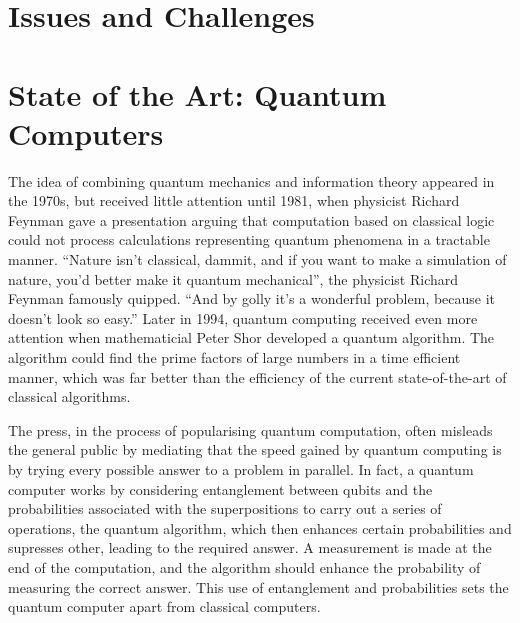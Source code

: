 \documentclass{article}
\begin{document}
\pagebreak
\section{Issues and Challenges}
\vspace{5mm}

\pagebreak
\section{State of the Art: Quantum Computers}
\vspace{5mm}

\noindent
The idea of combining quantum mechanics and information theory appeared in the 1970s, but received little attention until 1981, when physicist Richard Feynman gave a presentation arguing that computation based on classical logic could not process calculations representing quantum phenomena in a tractable manner. %
“Nature isn’t classical, dammit, and if you want to make a simulation of nature, you’d better make it
quantum mechanical”, the physicist Richard Feynman famously quipped. “And by golly it’s a
wonderful problem, because it doesn’t look so easy.” %
Later in 1994, quantum computing received even more attention when mathematicial Peter Shor developed a quantum algorithm. The algorithm could find the prime factors of large numbers in a time efficient manner, which was far better than the efficiency of the current state-of-the-art of classical algorithms. 
\vspace{5mm}

\noindent
The press, in the process of popularising quantum computation, often misleads the general public by mediating that the speed gained by quantum computing is by trying every possible  answer to a problem in parallel. In fact, a quantum computer works by considering entanglement between qubits and the probabilities associated with the superpositions to carry out a series of operations, the quantum algorithm, which then enhances certain probabilities and supresses other, leading to the required answer. A measurement is made at the end of the computation, and the algorithm should enhance the probability of measuring the correct answer. This use of entanglement and probabilities sets the quantum computer apart from classical computers. 

\vspace{5mm}
\end{document}
